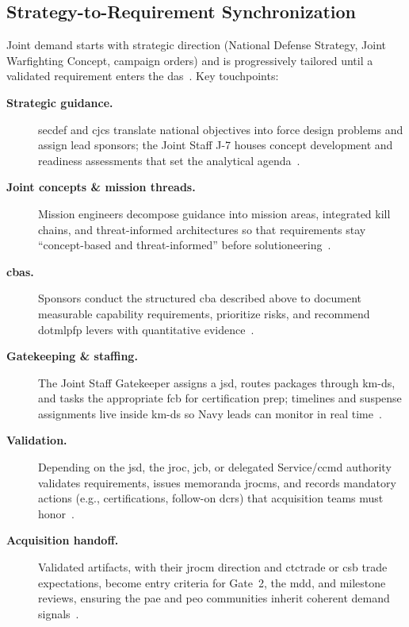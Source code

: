 \documentclass[../main.tex]{subfiles}
\begin{document}
\subsection{Strategy-to-Requirement Synchronization}
Joint demand starts with strategic direction (National Defense Strategy, Joint Warfighting Concept, campaign orders) and is progressively tailored until a validated requirement enters the \ac{das}~\autocite{jcids-manual-2021,edo-3-3-3-jcids-2025}. Key touchpoints:
\begin{description}
	\item[\textbf{Strategic guidance.}] \ac{secdef} and \ac{cjcs} translate national objectives into force design problems and assign lead sponsors; the Joint Staff J-7 houses concept development and readiness assessments that set the analytical agenda~\autocite{jcids-manual-2021}.
	\item[\textbf{Joint concepts \& mission threads.}] Mission engineers decompose guidance into mission areas, integrated kill chains, and threat-informed architectures so that requirements stay ``concept-based and threat-informed'' before solutioneering~\autocite[Encl.~A]{jcids-manual-2021}.
	\item[\textbf{\acp{cba}.}] Sponsors conduct the structured \ac{cba} described above to document measurable capability requirements, prioritize risks, and recommend \ac{dotmlpfp} levers with quantitative evidence~\autocite{jcids-manual-2021}.
	\item[\textbf{Gatekeeping \& staffing.}] The Joint Staff Gatekeeper assigns a \ac{jsd}, routes packages through \ac{km-ds}, and tasks the appropriate \ac{fcb} for certification prep; timelines and suspense assignments live inside \ac{km-ds} so Navy leads can monitor in real time~\autocite{jcids-manual-2021}.
	\item[\textbf{Validation.}] Depending on the \ac{jsd}, the \ac{jroc}, \ac{jcb}, or delegated Service/\ac{ccmd} authority validates requirements, issues memoranda \acp{jrocm}, and records mandatory actions (e.g., certifications, follow-on \acp{dcr}) that acquisition teams must honor~\autocite{jcids-manual-2021,USC-10-181}.
	\item[\textbf{Acquisition handoff.}] Validated artifacts, with their \ac{jrocm} direction and \ac{ctctrade} or \ac{csb} trade expectations, become entry criteria for Gate~2, the \ac{mdd}, and milestone reviews, ensuring the \ac{pae} and \ac{peo} communities inherit coherent demand signals~\autocite{edo-3-3-3-jcids-2025}.
\end{description}
\end{document}
